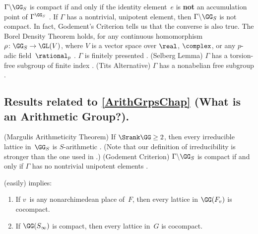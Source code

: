 	\begin{slist}
 $\Gamma \backslash \GG_S$ is compact if and only if the
identity element~$e$ is \textbf{not} an accumulation point
of $\Gamma^{\GG_S}$
\cite[Thm.~1.12, p.~22]{RaghunathanBook}.
 If $\Gamma$ has a nontrivial, unipotent element, then
$\Gamma \backslash \GG_S$ is not compact. In fact, Godement's Criterion  tells us that the converse is also true.
	 The Borel Density Theorem holds, for any continuous homomorphism $\rho \colon \GG_S \to \GL(V)$, where $V$ is a vector space over $\real$, $\complex$, or any $p$-adic field~$\rational_p$
\cite[Thm.~II.2.5 (and Lem.~II.2.3), p.~84]{MargulisBook}.
	 $\Gamma$ is finitely presented 
	\cite[Thm.~5.11, p.~272]{PlatonovRapinchukBook}.
	 (Selberg Lemma) $\Gamma$ has a torsion-free
subgroup of finite index
\cite[Thm.~6.11, p.~93]{RaghunathanBook}.
	 (Tits Alternative) $\Gamma$ has a nonabelian
free subgroup
\cite[App.~B, pp.~351--353]{MargulisBook}.
	\end{slist}



\subsection*{Results related to \cref{ArithGrpsChap} (What is an Arithmetic Group?).}

	\begin{slist}
	 (Margulis Arithmeticity Theorem) If $\Srank \GG \ge 2$, then every irreducible lattice in~$\GG_S$ is $S$-arithmetic
\cite[Thm.~IX.1.10, p.~298, and Rem.~(vi) on p.~290]{MargulisBook}. 
(Note that our definition of irreducibility is stronger than the one used in \cite{MargulisBook}.)
	 (Godement Criterion) $\Gamma \backslash \GG_S$ is compact if and only if $\Gamma$ has no nontrivial unipotent elements
\cite[Thm.~5.7(2), p.~268]{PlatonovRapinchukBook}.
	\end{slist}

\begin{rem*}  (easily) implies:
	\begin{enumerate}
	\item {\cite[Thm.~1]{Tamagawa-DiscSubgrpsPAdic}} If $v$~is any nonarchimedean place of~$F$, then every lattice in $\GG(F_v)$ is cocompact.
	\item If $\GG(S_\infty)$ is compact, then every lattice in~$G$ is cocompact.
	\end{enumerate}
\end{rem*}

